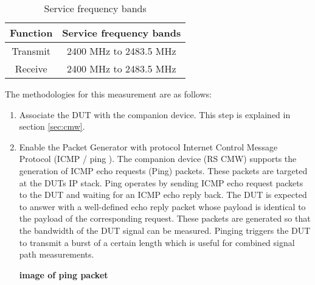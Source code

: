 \begin{table}[ht]
\begin{center}
\begin {tabular} {|c|c|} 
\toprule
Function & Service frequency bands \\ 
\midrule 
Transmit & 2400 MHz to 2483.5 MHz \\
Receive & 2400 MHz to 2483.5 MHz \\
\bottomrule
\end{tabular} 
\caption{Service frequency bands}
\label{tab:bands}
\end{center}
\end{table}
The methodologies for this measurement are as follows:
\begin{enumerate}
  \item Associate the DUT with the companion device. This step is explained in section \ref{sec:cmw}.
   \item Enable the Packet Generator with protocol Internet Control Message Protocol (ICMP / ping ). The companion device (\acs{RS}\textregistered{} \acs{CMW}) supports the generation of \acs{ICMP} echo requests (Ping) packets. These packets are targeted at the \acsp{DUT} \acs{IP} stack. Ping operates by sending \acs{ICMP} echo request packets to the \acs{DUT} and waiting for an \acs{ICMP} echo reply back. The \acs{DUT} is expected to answer with a well-defined echo reply packet whose payload is identical to the payload of the corresponding request. These packets are generated so that the bandwidth of the \acs{DUT} signal can be measured. Pinging triggers the \acs{DUT} to transmit a burst of a certain length which is useful for combined signal path measurements.

\textbf{image of ping packet}



\end{enumerate}
